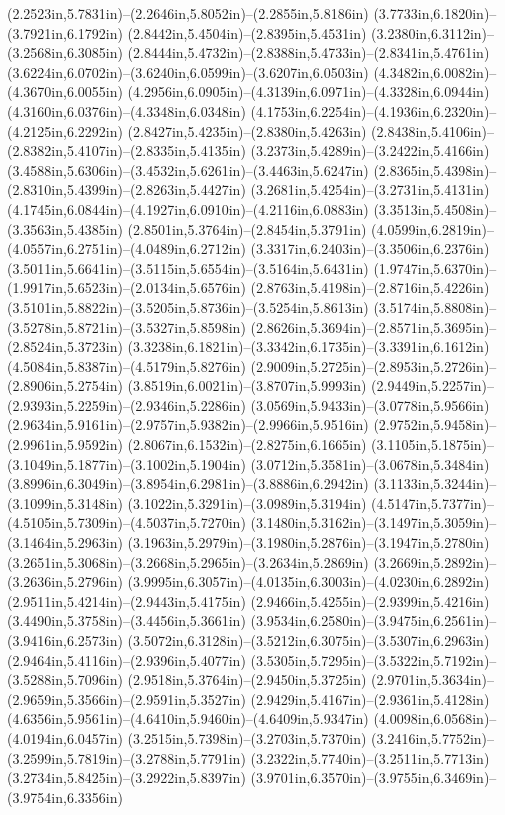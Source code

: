 (2.2523in,5.7831in)--(2.2646in,5.8052in)--(2.2855in,5.8186in) (3.7733in,6.1820in)--(3.7921in,6.1792in) (2.8442in,5.4504in)--(2.8395in,5.4531in) (3.2380in,6.3112in)--(3.2568in,6.3085in) (2.8444in,5.4732in)--(2.8388in,5.4733in)--(2.8341in,5.4761in) (3.6224in,6.0702in)--(3.6240in,6.0599in)--(3.6207in,6.0503in) (4.3482in,6.0082in)--(4.3670in,6.0055in) (4.2956in,6.0905in)--(4.3139in,6.0971in)--(4.3328in,6.0944in) (4.3160in,6.0376in)--(4.3348in,6.0348in) (4.1753in,6.2254in)--(4.1936in,6.2320in)--(4.2125in,6.2292in) (2.8427in,5.4235in)--(2.8380in,5.4263in) (2.8438in,5.4106in)--(2.8382in,5.4107in)--(2.8335in,5.4135in) (3.2373in,5.4289in)--(3.2422in,5.4166in) (3.4588in,5.6306in)--(3.4532in,5.6261in)--(3.4463in,5.6247in) (2.8365in,5.4398in)--(2.8310in,5.4399in)--(2.8263in,5.4427in) (3.2681in,5.4254in)--(3.2731in,5.4131in) (4.1745in,6.0844in)--(4.1927in,6.0910in)--(4.2116in,6.0883in) (3.3513in,5.4508in)--(3.3563in,5.4385in) (2.8501in,5.3764in)--(2.8454in,5.3791in) (4.0599in,6.2819in)--(4.0557in,6.2751in)--(4.0489in,6.2712in) (3.3317in,6.2403in)--(3.3506in,6.2376in) (3.5011in,5.6641in)--(3.5115in,5.6554in)--(3.5164in,5.6431in) (1.9747in,5.6370in)--(1.9917in,5.6523in)--(2.0134in,5.6576in) (2.8763in,5.4198in)--(2.8716in,5.4226in) (3.5101in,5.8822in)--(3.5205in,5.8736in)--(3.5254in,5.8613in) (3.5174in,5.8808in)--(3.5278in,5.8721in)--(3.5327in,5.8598in) (2.8626in,5.3694in)--(2.8571in,5.3695in)--(2.8524in,5.3723in) (3.3238in,6.1821in)--(3.3342in,6.1735in)--(3.3391in,6.1612in) (4.5084in,5.8387in)--(4.5179in,5.8276in) (2.9009in,5.2725in)--(2.8953in,5.2726in)--(2.8906in,5.2754in) (3.8519in,6.0021in)--(3.8707in,5.9993in) (2.9449in,5.2257in)--(2.9393in,5.2259in)--(2.9346in,5.2286in) (3.0569in,5.9433in)--(3.0778in,5.9566in) (2.9634in,5.9161in)--(2.9757in,5.9382in)--(2.9966in,5.9516in) (2.9752in,5.9458in)--(2.9961in,5.9592in) (2.8067in,6.1532in)--(2.8275in,6.1665in) (3.1105in,5.1875in)--(3.1049in,5.1877in)--(3.1002in,5.1904in) (3.0712in,5.3581in)--(3.0678in,5.3484in) (3.8996in,6.3049in)--(3.8954in,6.2981in)--(3.8886in,6.2942in) (3.1133in,5.3244in)--(3.1099in,5.3148in) (3.1022in,5.3291in)--(3.0989in,5.3194in) (4.5147in,5.7377in)--(4.5105in,5.7309in)--(4.5037in,5.7270in) (3.1480in,5.3162in)--(3.1497in,5.3059in)--(3.1464in,5.2963in) (3.1963in,5.2979in)--(3.1980in,5.2876in)--(3.1947in,5.2780in) (3.2651in,5.3068in)--(3.2668in,5.2965in)--(3.2634in,5.2869in) (3.2669in,5.2892in)--(3.2636in,5.2796in) (3.9995in,6.3057in)--(4.0135in,6.3003in)--(4.0230in,6.2892in) (2.9511in,5.4214in)--(2.9443in,5.4175in) (2.9466in,5.4255in)--(2.9399in,5.4216in) (3.4490in,5.3758in)--(3.4456in,5.3661in) (3.9534in,6.2580in)--(3.9475in,6.2561in)--(3.9416in,6.2573in) (3.5072in,6.3128in)--(3.5212in,6.3075in)--(3.5307in,6.2963in) (2.9464in,5.4116in)--(2.9396in,5.4077in) (3.5305in,5.7295in)--(3.5322in,5.7192in)--(3.5288in,5.7096in) (2.9518in,5.3764in)--(2.9450in,5.3725in) (2.9701in,5.3634in)--(2.9659in,5.3566in)--(2.9591in,5.3527in) (2.9429in,5.4167in)--(2.9361in,5.4128in) (4.6356in,5.9561in)--(4.6410in,5.9460in)--(4.6409in,5.9347in) (4.0098in,6.0568in)--(4.0194in,6.0457in) (3.2515in,5.7398in)--(3.2703in,5.7370in) (3.2416in,5.7752in)--(3.2599in,5.7819in)--(3.2788in,5.7791in) (3.2322in,5.7740in)--(3.2511in,5.7713in) (3.2734in,5.8425in)--(3.2922in,5.8397in) (3.9701in,6.3570in)--(3.9755in,6.3469in)--(3.9754in,6.3356in) 